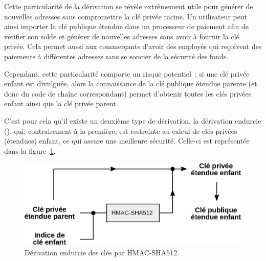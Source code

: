 Cette particularité de la dérivation se révèle extrêmement utile pour générer de nouvelles adresses sans compromettre la clé privée racine. Un utilisateur peut ainsi importer la clé publique étendue dans un processeur de paiement afin de vérifier son solde et générer de nouvelles adresses sans avoir à fournir la clé privée. Cela permet aussi aux commerçants d'avoir des employés qui reçoivent des paiements à différentes adresses sans se soucier de la sécurité des fonds.

Cependant, cette particularité comporte un risque potentiel~: si une clé privée enfant est divulguée, alors la connaissance de la clé publique étendue parente (et donc du code de chaîne correspondant) permet d'obtenir toutes les clés privées enfant ainsi que la clé privée parent.


C'est pour cela qu'il existe un deuxième type de dérivation, la dérivation endurcie (), qui, contrairement à la première, est restreinte au calcul de clés privées (étendues) enfant, ce qui assure une meilleure sécurité. Celle-ci est représentée dans la figure~\ref{fig:hardened-child-key-derivation}.

\begin{figure}[h]
  \centering
  \includegraphics[scale=0.7]{img/hardened-child-key-derivation.eps}
  \caption{Dérivation endurcie des clés par HMAC-SHA512.}
  \label{fig:hardened-child-key-derivation}
\end{figure}

